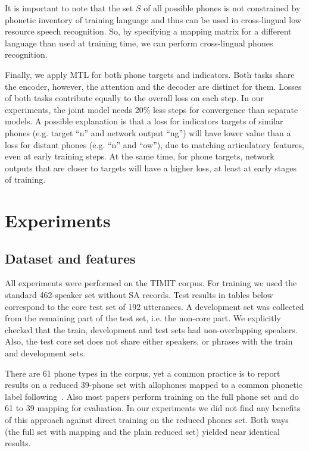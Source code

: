 \documentclass[a4paper]{article}
\begin{document}
It is important to note that the set $ S $ of all possible phones is not constrained by phonetic inventory of training language and thus can be used in cross-lingual low resource speech recognition. So, by specifying a mapping matrix for a different language than used at training time, we can perform cross-lingual phones recognition.

Finally, we apply MTL for both phone targets and indicators. Both tasks share the encoder, however, the attention and the decoder are distinct for them. Losses of both tasks contribute equally to the overall loss on each step. In our experiments, the joint model needs 20\% less steps for convergence than separate models. A possible explanation is that a loss for indicators targets of similar phones (e.g. target ``n'' and network output ``ng'') will have lower value than a loss for distant phones (e.g. ``n'' and ``ow''), due to matching articulatory features, even at early training steps. At the same time, for phone targets, network outputs that are closer to targets will have a higher loss, at least at early stages of training.

\section{Experiments}
\subsection{Dataset and features}
All experiments were performed on the TIMIT corpus. For training we used the standard 462-speaker set without SA records. Test results in tables below correspond to the core test set of 192 utterances. A development set was collected from the remaining part of the test set, i.e. the non-core part. We explicitly checked that the train, development and test sets had non-overlapping speakers. Also, the test core set does not share either speakers, or phrases with the train and development sets.

There are 61 phone types in the corpus, yet a common practice is to report results on a reduced 39-phone set with allophones mapped to a common phonetic label following~\cite{Lee-1989}. Also most papers perform training on the full phone set and do 61 to 39 mapping for evaluation. In our experiments we did not find any benefits of this approach against direct training on the reduced phones set. Both ways (the full set with mapping and the plain reduced set) yielded near identical results.
\end{document}

